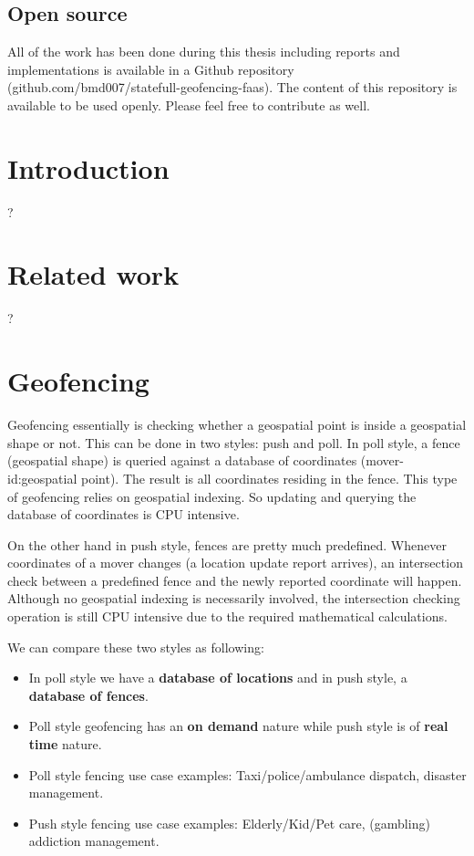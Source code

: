 \documentclass[a4]{report}
\begin{document}
    \section{Open source}
    All of the work has been done during this thesis including reports and implementations is available in
    a Github repository (github.com/bmd007/statefull-geofencing-faas).
    The content of this repository is available to be used openly.
    Please feel free to contribute as well.

    \chapter{Introduction}
    ?

    \chapter{Related work}
    ?

    \chapter{Geofencing}
    Geofencing essentially is checking whether a geospatial point is inside a geospatial shape or not.
    This can be done in two styles: push and poll.
    In poll style, a fence (geospatial shape) is queried against a database of coordinates (mover-id:geospatial point).
    The result is all coordinates residing in the fence.
    This type of geofencing relies on geospatial indexing.
    So updating and querying the database of coordinates is CPU intensive.

    On the other hand in push style, fences are pretty much predefined.
    Whenever coordinates of a mover changes (a location update report arrives), an intersection check between a
    predefined fence and the newly reported coordinate will happen.
    Although no geospatial indexing is necessarily involved, the intersection checking operation is still CPU
    intensive due to the required mathematical calculations.

    We can compare these two styles as following:
    \begin{itemize}
        \item In poll style we have a \textbf{database of locations} and in push style, a \textbf{database of fences}.
        \item Poll style geofencing has an \textbf{on demand} nature while push style is of \textbf{real time} nature.
        \item Poll style fencing use case examples: Taxi/police/ambulance dispatch, disaster management.
        \item Push style fencing use case examples: Elderly/Kid/Pet care, (gambling) addiction management.
    \end{itemize}
\end{document}
